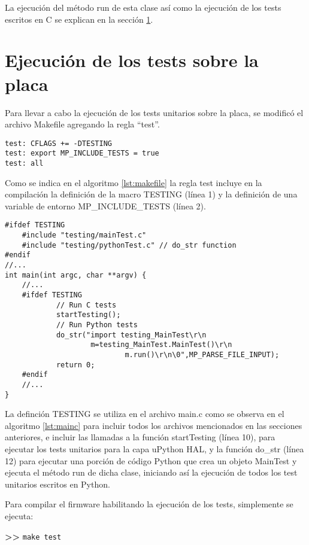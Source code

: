 La ejecución del método run de esta clase así como la ejecución de los tests escritos en C se explican en la sección \ref{sec:testUnitariosPlaca}.

\section{Ejecución de los tests sobre la placa}
\label{sec:testUnitariosPlaca}

Para llevar a cabo la ejecución de los tests unitarios sobre la placa, se modificó el archivo Makefile agregando la regla "`test"'. 

\begin{lstlisting}[label={lst:makefile},caption=Regla test en Makefile.]
test: CFLAGS += -DTESTING
test: export MP_INCLUDE_TESTS = true
test: all 
\end{lstlisting}

Como se indica en el algoritmo \ref{lst:makefile} la regla test incluye en la compilación la definición de la macro TESTING (línea 1) y la definición de una variable de entorno MP\_INCLUDE\_TESTS (línea 2).

\begin{lstlisting}[label={lst:mainc},caption=Inclusión de los archivos de test en el main.]
#ifdef TESTING
    #include "testing/mainTest.c"
    #include "testing/pythonTest.c" // do_str function
#endif
//...
int main(int argc, char **argv) {
	//...
	#ifdef TESTING
			// Run C tests
			startTesting();
			// Run Python tests
			do_str("import testing_MainTest\r\n
			        m=testing_MainTest.MainTest()\r\n
							m.run()\r\n\0",MP_PARSE_FILE_INPUT);
			return 0;
	#endif
	//...
}
\end{lstlisting}

La definción TESTING se utiliza en el archivo main.c como se observa en el algoritmo \ref{lst:mainc} para incluir todos los archivos mencionados en las secciones anteriores, e incluir las llamadas a la función startTesting (línea 10), para ejecutar los tests unitarios para la capa uPython HAL, y la función do\_str (línea 12) para ejecutar una porción de código Python que crea un objeto MainTest y ejecuta el método run de dicha clase, iniciando así la ejecución de todos los test unitarios escritos en Python.

Para compilar el firmware habilitando la ejecución de los tests, simplemente se ejecuta:

\textbf{{\fontsize{16}{16}\selectfont \textgreater\textgreater}} \texttt{make test}\\

